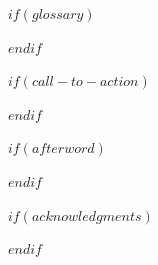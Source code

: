 \def\backmatterflourishnumber{$if(backmatter-flourish)$$backmatter-flourish$$else$88$endif$}
\def\flourishnone{none}
\newcommand{\backmatterflourish}{\ifx\backmatterflourishnumber\flourishnone\else\pgfornament[width=4cm]{\backmatterflourishnumber}\fi}

\def\afterwordflourishnumber{$if(afterword-flourish)$$afterword-flourish$$else$none$endif$}
\newcommand{\afterwordflourish}{\ifx\afterwordflourishnumber\flourishnone\else\pgfornament[width=3cm]{\afterwordflourishnumber}\par\vspace{6pt}\fi}

\newcommand{\backmatterteaser}[3]{%
  \vspace*{\stretch{1}}%
  {\centering{\primaryfont\scshape\addfontfeature{LetterSpace=8}\MakeTextLowercase{#1}}\par
   \vspace{16pt}%
   {\titlefont\Huge #2}\par
   \vspace{20pt}%
   {\scshape\addfontfeature{LetterSpace=5}\MakeTextLowercase{#3}}\par}}


$if(glossary)$


\clearpage{\thispagestyle{empty}\cleardoublepage}
$endif$

$if(call-to-action)$


\clearpage{\thispagestyle{empty}\cleardoublepage}
$endif$


$if(afterword)$


\clearpage{\thispagestyle{empty}\cleardoublepage}
$endif$

$if(acknowledgments)$


\clearpage{\thispagestyle{empty}\cleardoublepage}
$endif$

